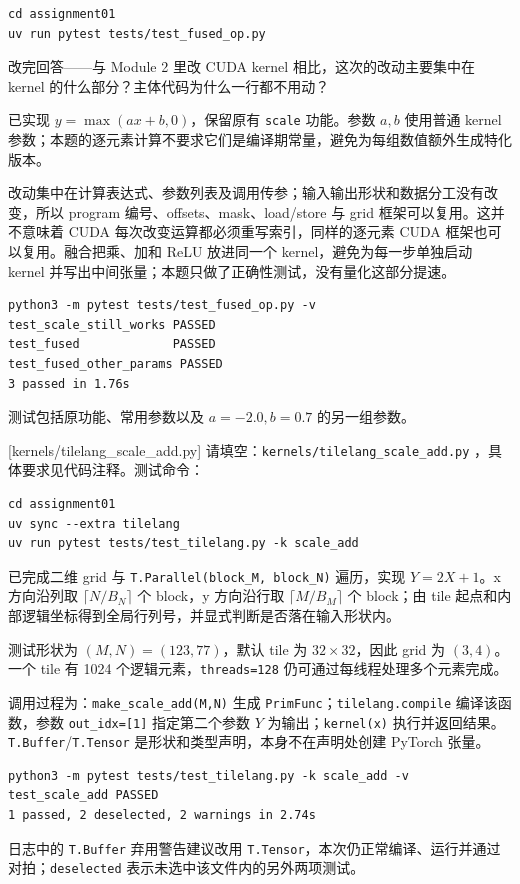 \documentclass[11pt,a4paper,fontset=none]{ctexart}
\begin{document}
\begin{lstlisting}
cd assignment01
uv run pytest tests/test_fused_op.py
\end{lstlisting}

改完回答——与 Module 2 里改 CUDA kernel 相比，这次的改动主要集中在 kernel 的什么部分？主体代码为什么一行都不用动？

\begin{tcolorbox}[title={7.2 实现、作答与实验记录},breakable]
已实现 $y=\max(ax+b,0)$，保留原有 \texttt{scale} 功能。参数 $a,b$ 使用普通 kernel 参数；本题的逐元素计算不要求它们是编译期常量，避免为每组数值额外生成特化版本。

改动集中在计算表达式、参数列表及调用传参；输入输出形状和数据分工没有改变，所以 program 编号、offsets、mask、load/store 与 grid 框架可以复用。这并不意味着 CUDA 每次改变运算都必须重写索引，同样的逐元素 CUDA 框架也可以复用。融合把乘、加和 ReLU 放进同一个 kernel，避免为每一步单独启动 kernel 并写出中间张量；本题只做了正确性测试，没有量化这部分提速。

\begin{lstlisting}
python3 -m pytest tests/test_fused_op.py -v
test_scale_still_works PASSED
test_fused             PASSED
test_fused_other_params PASSED
3 passed in 1.76s
\end{lstlisting}
测试包括原功能、常用参数以及 $a=-2.0,b=0.7$ 的另一组参数。
\end{tcolorbox}

[kernels/tilelang\_scale\_add.py]
请填空：\texttt{kernels/tilelang\_scale\_add.py} ，具体要求见代码注释。测试命令：

\begin{lstlisting}
cd assignment01
uv sync --extra tilelang
uv run pytest tests/test_tilelang.py -k scale_add
\end{lstlisting}

\begin{tcolorbox}[title={7.3 实现与实验记录},breakable]
已完成二维 grid 与 \texttt{T.Parallel(block\_M, block\_N)} 遍历，实现 $Y=2X+1$。x 方向沿列取 $\lceil N/B_N\rceil$ 个 block，y 方向沿行取 $\lceil M/B_M\rceil$ 个 block；由 tile 起点和内部逻辑坐标得到全局行列号，并显式判断是否落在输入形状内。

测试形状为 $(M,N)=(123,77)$，默认 tile 为 $32\times32$，因此 grid 为 $(3,4)$。一个 tile 有 1024 个逻辑元素，\texttt{threads=128} 仍可通过每线程处理多个元素完成。

调用过程为：\texttt{make\_scale\_add(M,N)} 生成 \texttt{PrimFunc}；\texttt{tilelang.compile} 编译该函数，参数 \texttt{out\_idx=[1]} 指定第二个参数 $Y$ 为输出；\texttt{kernel(x)} 执行并返回结果。\texttt{T.Buffer}/\texttt{T.Tensor} 是形状和类型声明，本身不在声明处创建 PyTorch 张量。

\begin{lstlisting}
python3 -m pytest tests/test_tilelang.py -k scale_add -v
test_scale_add PASSED
1 passed, 2 deselected, 2 warnings in 2.74s
\end{lstlisting}
日志中的 \texttt{T.Buffer} 弃用警告建议改用 \texttt{T.Tensor}，本次仍正常编译、运行并通过对拍；\texttt{deselected} 表示未选中该文件内的另外两项测试。
\end{tcolorbox}
\end{document}
